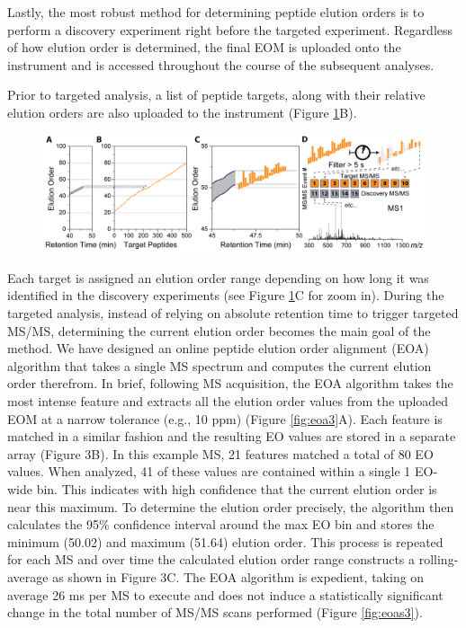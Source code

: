 Lastly, the most robust method for determining peptide elution orders is to perform a discovery experiment right before the targeted experiment. Regardless of how elution order is determined, the final EOM is uploaded onto the instrument and is accessed throughout the course of the subsequent analyses.

Prior to targeted analysis, a list of peptide targets, along with their relative elution orders are also uploaded to the instrument (Figure \ref{fig:eoa4}B).
\begin{figure}
	\centering
	\includegraphics[width=\columnwidth]{eoa/EOA 4.png}
	\label{fig:eoa4}
\end{figure} 
Each target is assigned an elution order range depending on how long it was identified in the discovery experiments (see Figure \ref{fig:eoa4}C for zoom in). During the targeted analysis, instead of relying on absolute retention time to trigger targeted MS/MS, determining the current elution order becomes the main goal of the method. We have designed an online peptide elution order alignment (EOA) algorithm that takes a single MS spectrum and computes the current elution order therefrom. In brief, following MS acquisition, the EOA algorithm takes the most intense \mz{} feature and extracts all the elution order values from the uploaded EOM at a narrow \mz{} tolerance (e.g., 10 ppm) (Figure \ref{fig:eoa3}A). Each \mz{} feature is matched in a similar fashion and the resulting EO values are stored in a separate array (Figure 3B). In this example MS, 21 \mz{} features matched a total of 80 EO values. When analyzed, 41 of these values are contained within a single 1 EO-wide bin. This indicates with high confidence that the current elution order is near this maximum. To determine the elution order precisely, the algorithm then calculates the 95\% confidence interval around the max EO bin and stores the minimum (50.02) and maximum (51.64) elution order. This process is repeated for each MS and over time the calculated elution order range constructs a rolling-average as shown in Figure 3C. The EOA algorithm is expedient, taking on average 26 ms per MS to execute and does not induce a statistically significant change in the total number of MS/MS scans performed (Figure \ref{fig:eoas3}).
